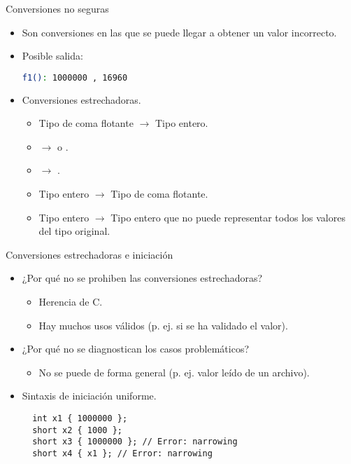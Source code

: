 \begin{frame}[fragile]{Conversiones no seguras}
\vspace{-0.5em}
\begin{itemize}
  \item Son conversiones en las que se puede llegar a obtener un valor incorrecto.

  \item Posible salida:
\begin{lstlisting}[language=bash,basicstyle=\footnotesize\ttfamily]
f1(): 1000000 , 16960
\end{lstlisting}
  \item Conversiones estrechadoras.
    \begin{itemize}
      \item Tipo de coma flotante $\rightarrow$ Tipo entero.
      \item {} $\rightarrow$  o .
      \item {} $\rightarrow$ .
      \item Tipo entero $\rightarrow$ Tipo de coma flotante.
      \item Tipo entero $\rightarrow$ Tipo entero que no puede representar todos los valores del tipo original.
    \end{itemize}
\end{itemize}
\end{frame}

\begin{frame}[t,fragile]{Conversiones estrechadoras e iniciación}
\begin{itemize}
  \item ¿Por qué no se prohiben las conversiones estrechadoras?
    \begin{itemize}
      \item Herencia de C.
      \item Hay muchos usos válidos (p. ej. si se ha validado el valor).
    \end{itemize}
  \item ¿Por qué no se diagnostican los casos problemáticos?
    \begin{itemize}
      \item No se puede de forma general (p. ej. valor leído de un archivo).
    \end{itemize}
  \item Sintaxis de iniciación uniforme.
\begin{lstlisting}
  int x1 { 1000000 };
  short x2 { 1000 };
  short x3 { 1000000 }; // Error: narrowing
  short x4 { x1 }; // Error: narrowing
\end{lstlisting}
\end{itemize}
\end{frame}

